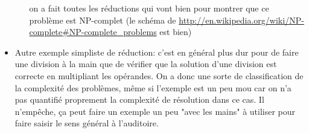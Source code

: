 \documentclass[a4paper]{article}
\begin{document}
\begin{itemize}
\begin{itemize}
on a fait toutes les réductions qui vont bien pour montrer que ce problème est
NP-complet (le schéma de
\url{http://en.wikipedia.org/wiki/NP-complete#NP-complete_problems} est bien)
\end{itemize}
\item Autre exemple simpliste de réduction: c'est en général plus dur pour de
faire une division à la main que de vérifier que la solution d'une division est
correcte en multipliant les opérandes. On a donc une sorte de classification de
la complexité des problèmes, même si l'exemple est un peu mou car on n'a pas
quantifié proprement la complexité de résolution dans ce cas. Il n'empêche, ça
peut faire un exemple un peu "avec les mains" à utiliser pour faire saisir le
sens général à l'auditoire.
\end{itemize}
\end{document}
